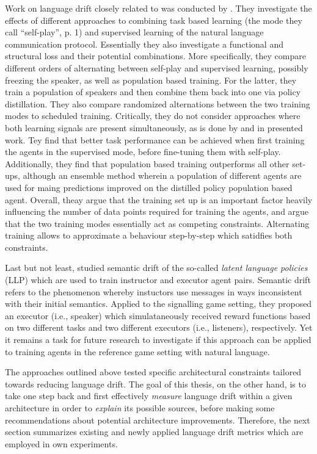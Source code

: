 Work on language drift closely related to \cite{lazaridou2020multi} was conducted by \cite{lowe2020interaction}. They investigate the effects of different approaches to combining task based learning (the mode they call ``self-play'', p. 1) and supervised learning of the natural language communication protocol. Essentially they also investigate a functional and structural loss and their potential combinations. %
More specifically, they compare different orders of alternating between self-play and supervised learning, possibly freezing the speaker, as well as population based training. For the latter, they train a population of speakers and then combine them back into one via policy distillation. They also compare randomized alternations between the two training modes to scheduled training. 
Critically, they do not consider approaches where both learning signals are present simultaneously, as is done by \cite{lazaridou2020multi} and in presented work.
Tey find that better task performance can be achieved when first training the agents in the supervised mode, before fine-tuning them with self-play. Additionally, they find that population based training outperforms all other set-ups, although an ensemble method wherein a population of different agents are used for maing predictions improved on the distilled policy population based agent. Overall, theay argue that the training set up is an important factor heavily influencing the number of data points required for training the agents, and argue that the two training modes essentially act as competing constraints. Alternating training allows to approximate a behaviour step-by-step which satidfies both constraints.  

Last but not least, \cite{jacob2021multitasking} studied semantic drift of the so-called \textit{latent language policies} (LLP) which are used to train instructor and executor agent pairs. Semantic drift refers to the phenomenon whereby instuctors use messages in ways inconsistent with their initial semantics. Applied to the signalling game setting, they proposed an executor (i.e., speaker) which simulataneously received reward functions based on two different tasks and two different executors (i.e., listeners), respectively. Yet it remains a task for future research to investigate if this approach can be applied to training agents in the reference game setting with natural language.

The approaches outlined above tested specific architectural constraints tailored towards reducing language drift. The goal of this thesis, on the other hand, is to take one step back and first effectively \textit{measure} language drift within a given architecture in order to \textit{explain} its possible sources, before making some recommendations about potential architecture improvements. Therefore, the next section summarizes existing and newly applied language drift metrics which are employed in own experiments.  

